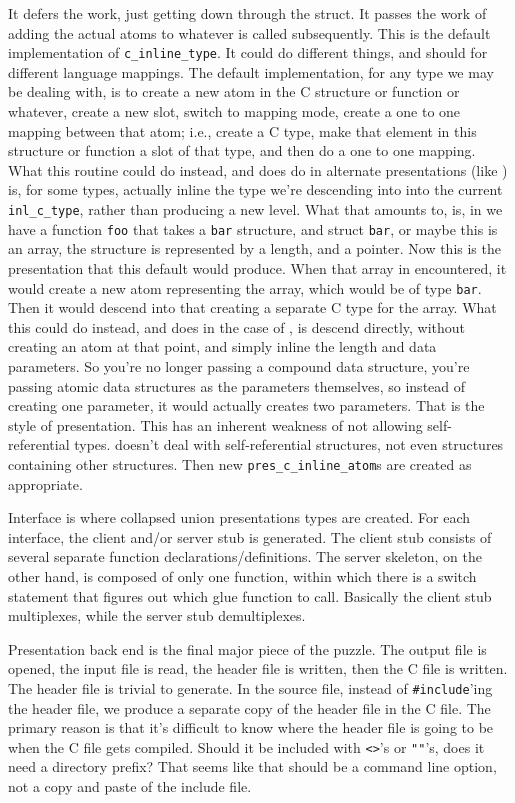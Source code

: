 It defers the work, just getting down through the \MINT{} struct.  It passes the
work of adding the actual atoms to whatever is called subsequently.  This is
the default implementation of \texttt{c\_inline\_type}.  It could do different
things, and should for different language mappings.  The default
implementation, for any \AOI{} type we may be dealing with, is to create a new
atom in the C structure or function or whatever, create a new slot, switch to
mapping mode, create a one to one mapping between that atom; i.e., create a C
type, make that element in this structure or function a slot of that type, and
then do a one to one mapping.  What this routine could do instead, and does do
in alternate presentations (like \MIG{}) is, for some types, actually inline the
type we're descending into into the current \texttt{inl\_c\_type}, rather than
producing a new level.  What that amounts to, is, in \CORBA{} we have a function
\texttt{foo} that takes a \texttt{bar} structure, and struct \texttt{bar}, or
maybe this is an array, the structure is represented by a length, and a
pointer.  Now this is the presentation that this default would produce.  When
that \AOI{} array in encountered, it would create a new atom representing the
array, which would be of type \texttt{bar}.  Then it would descend into that
creating a separate C type for the array.  What this could do instead, and does
in the case of \MIG{}, is descend directly, without creating an atom at that
point, and simply inline the length and data parameters.  So you're no longer
passing a compound data structure, you're passing atomic data structures as the
parameters themselves, so instead of creating one parameter, it would actually
creates two parameters.  That is the \MIG{} style of presentation.  This has an
inherent weakness of not allowing self-referential types.  \MIG{} doesn't deal
with self-referential structures, not even structures containing other
structures.  Then new \texttt{pres\_c\_inline\_atom}s are created as
appropriate.

Interface is where collapsed union presentations types are created.  For each
interface, the client and/or server stub is generated.  The client stub
consists of several separate function declarations/definitions.  The server
skeleton, on the other hand, is composed of only one function, within which
there is a switch statement that figures out which glue function to call.
Basically the client stub multiplexes, while the server stub demultiplexes.

Presentation back end is the final major piece of the puzzle.  The output file
is opened, the input file is read, the header file is written, then the C file
is written.  The header file is trivial to generate.  In the source file,
instead of \texttt{\#include}'ing the header file, we produce a separate copy
of the header file in the C file.  The primary reason is that it's difficult to
know where the header file is going to be when the C file gets compiled.
Should it be included with \texttt{<>}'s or \texttt{""}'s, does it need a
directory prefix?  That seems like that should be a command line option, not
a copy and paste of the include file.

